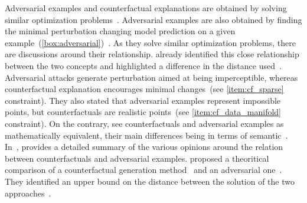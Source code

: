 \documentclass[../main.tex]{subfiles}
\begin{document}
	Adversarial examples and counterfactual explanations are obtained by solving similar optimization problems~\cite{Pawelczyk2021ExploringCE,Freiesleben2021}.
	Adversarial examples are also obtained by finding the minimal perturbation changing model prediction on a given example~(\cref{box:adversarial})~\cite{Szegedy2013IntriguingPO}.
	As they solve similar optimization problems, there are discussions around their relationship.
	\citeauthor{wachter2017counterfactual} already identified this close relationship between the two concepts and highlighted a difference in the distance used~\cite{wachter2017counterfactual}.
	Adversarial attacks generate perturbation aimed at being imperceptible, whereas counterfactual explanation encourages minimal changes~(see \ref{item:cf_sparse} constraint).
	They also stated that adversarial examples represent impossible points, but counterfactuals are realistic points~(see \ref{item:cf_data_manifold} constraint).
	On the contrary, \citeauthor{browne2020} see counterfactuals and adversarial examples as mathematically equivalent, their main differences being in terms of semantic~\cite{browne2020}.
	In~\cite{Freiesleben2021}, \citeauthor{Freiesleben2021} provides a detailed summary of the various opinions around the relation between counterfactuals and adversarial examples.
	\citeauthor{Pawelczyk2021ExploringCE} proposed a theoritical comparison of a counterfactual generation method~\cite{wachter2017counterfactual} and an adversarial one~\cite{Carlini2016TowardsET}.
	They identified an upper bound on the distance between the solution of the two approaches~\cite{Pawelczyk2021ExploringCE}.
\end{document}

